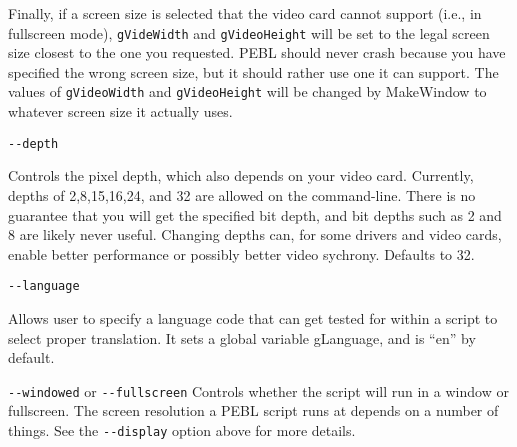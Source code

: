 \begin{description}
Finally, if a screen size is selected that the video card cannot
support (i.e., in fullscreen mode), \texttt{gVideWidth} and \texttt{gVideoHeight} will
be set to the legal screen size closest to the one you requested.  PEBL should never crash because 
you have specified the wrong screen size, but it should rather use one it can support.  The values of 
\texttt{gVideoWidth} and \texttt{gVideoHeight} will be changed by MakeWindow to whatever screen size it actually uses.

\item
\begin{verbatim}
--depth
\end{verbatim}
  Controls the pixel depth, which also  depends on your video card.
  Currently, depths of 2,8,15,16,24, and 32 are allowed on the
  command-line.  There is no guarantee that you will get the
  specified bit depth, and bit depths such as 2 and 8 are
  likely never useful.  Changing depths can, for
  some drivers and video cards, enable better performance or
  possibly better video sychrony.  Defaults to 32.

\item
\begin{verbatim}
--language
\end{verbatim}
  Allows user to specify a language code that can get tested for
  within a script to select proper translation.  It sets a global
  variable gLanguage, and is ``en'' by default.

\item
\verb+--windowed+ or \verb+--fullscreen+
Controls whether the script will run in a window or fullscreen.  
The screen resolution a PEBL script runs at depends on a number of things.  See the \verb+--display+ option above for more details.


\end{description}



